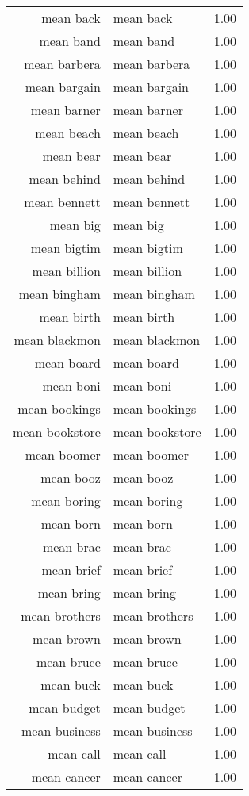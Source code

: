\begin{table}[ht]
\begin{tabular}{rlr}
  mean back & mean back & 1.00 \\ 
  mean band & mean band & 1.00 \\ 
  mean barbera & mean barbera & 1.00 \\ 
  mean bargain & mean bargain & 1.00 \\ 
  mean barner & mean barner & 1.00 \\ 
  mean beach & mean beach & 1.00 \\ 
  mean bear & mean bear & 1.00 \\ 
  mean behind & mean behind & 1.00 \\ 
  mean bennett & mean bennett & 1.00 \\ 
  mean big & mean big & 1.00 \\ 
  mean bigtim & mean bigtim & 1.00 \\ 
  mean billion & mean billion & 1.00 \\ 
  mean bingham & mean bingham & 1.00 \\ 
  mean birth & mean birth & 1.00 \\ 
  mean blackmon & mean blackmon & 1.00 \\ 
  mean board & mean board & 1.00 \\ 
  mean boni & mean boni & 1.00 \\ 
  mean bookings & mean bookings & 1.00 \\ 
  mean bookstore & mean bookstore & 1.00 \\ 
  mean boomer & mean boomer & 1.00 \\ 
  mean booz & mean booz & 1.00 \\ 
  mean boring & mean boring & 1.00 \\ 
  mean born & mean born & 1.00 \\ 
  mean brac & mean brac & 1.00 \\ 
  mean brief & mean brief & 1.00 \\ 
  mean bring & mean bring & 1.00 \\ 
  mean brothers & mean brothers & 1.00 \\ 
  mean brown & mean brown & 1.00 \\ 
  mean bruce & mean bruce & 1.00 \\ 
  mean buck & mean buck & 1.00 \\ 
  mean budget & mean budget & 1.00 \\ 
  mean business & mean business & 1.00 \\ 
  mean call & mean call & 1.00 \\ 
  mean cancer & mean cancer & 1.00 \\ 

\end{tabular}
\end{table}
